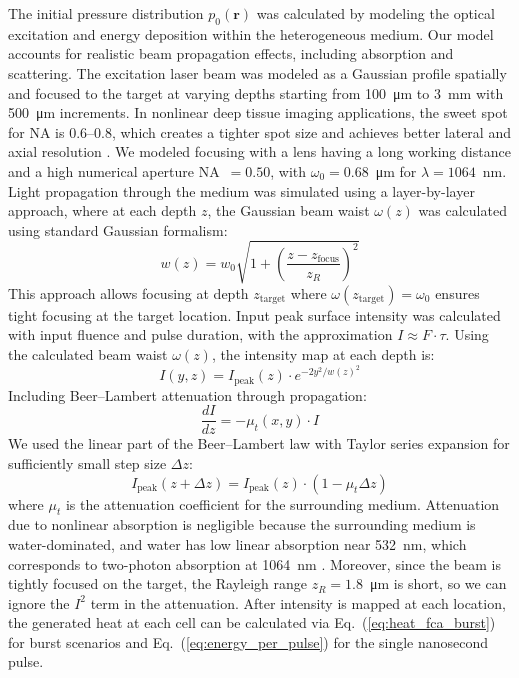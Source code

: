 \documentclass{optica-article}
\begin{document}
The initial pressure distribution $p_0(\mathbf{r})$ was calculated by modeling the optical excitation and energy deposition within the heterogeneous medium. Our model accounts for realistic beam propagation effects, including absorption and scattering. The excitation laser beam was modeled as a Gaussian profile spatially and focused to the target at varying depths starting from 100~\si{\micro m} to 3~\si{mm} with 500~\si{\micro m} increments. In nonlinear deep tissue imaging applications, the sweet spot for NA is 0.6--0.8, which creates a tighter spot size and achieves better lateral and axial resolution \cite{crosignani2012deep-8f3}. We modeled focusing with a lens having a long working distance and a high numerical aperture NA~$= 0.50$, with $\omega_0 = 0.68$~\si{\micro m} for $\lambda = 1064$~\si{nm}. Light propagation through the medium was simulated using a layer-by-layer approach, where at each depth $z$, the Gaussian beam waist $\omega(z)$ was calculated using standard Gaussian formalism:
\begin{equation}
w(z) = w_0 \sqrt{1 + \left(\frac{z - z_{\text{focus}}}{z_R}\right)^2}
\end{equation}
This approach allows focusing at depth $z_\text{target}$ where $\omega(z_\text{target}) = \omega_0$ ensures tight focusing at the target location. Input peak surface intensity was calculated with input fluence and pulse duration, with the approximation $I \approx F \cdot \tau$. Using the calculated beam waist $\omega(z)$, the intensity map at each depth is:
\begin{equation}
I(y, z) = I_{\text{peak}}(z) \cdot e^{-2y^2 / w(z)^2}
\end{equation}
Including Beer--Lambert attenuation through propagation:
\begin{equation}
\frac{dI}{dz} = -\mu_t(x,y) \cdot I
\label{eq:beam_propagation}
\end{equation}
We used the linear part of the Beer--Lambert law with Taylor series expansion for sufficiently small step size $\Delta z$:
\begin{equation}
I_{\text{peak}}(z + \Delta z) = I_{\text{peak}}(z) \cdot (1 - \mu_t \Delta z)
\end{equation}
where $\mu_t$ is the attenuation coefficient for the surrounding medium. Attenuation due to nonlinear absorption is negligible because the surrounding medium is water-dominated, and water has low linear absorption near 532~nm, which corresponds to two-photon absorption at 1064~nm \cite{litjens1999visible-7ef}. Moreover, since the beam is tightly focused on the target, the Rayleigh range $z_R = 1.8$~\si{\micro m} is short, so we can ignore the $I^2$ term in the attenuation. After intensity is mapped at each location, the generated heat at each cell can be calculated via Eq.~(\ref{eq:heat_fca_burst}) for burst scenarios and Eq.~(\ref{eq:energy_per_pulse}) for the single nanosecond pulse.
\end{document}
